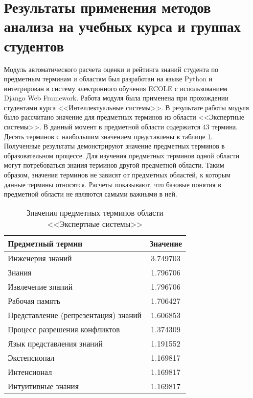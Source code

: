 \section{Результаты применения методов анализа на учебных курса и группах студентов} \label{sect4_5}

Модуль автоматического расчета оценки и рейтинга знаний студента по предметным терминам и областям был разработан на языке Python и интегрирован в систему электронного обучения ECOLE с использованием Django Web Framework. Работа модуля была применена при прохождении студентами курса <<Интеллектуальные системы>>. В результате работы модуля было рассчитано значение для предметных терминов из области <<Экспертные системы>>. В данный момент в предметной области содержится 43 термина. Десять терминов с наибольшим значением представлены в таблице \ref{table:term_importance_result}. Полученные результаты демонстрируют значение предметных терминов в образовательном процессе. Для изучения предметных терминов одной области могут потребоваться знания терминов другой предметной области. Таким образом, значения терминов не зависят от предметных областей, к которым данные термины относятся. Расчеты показывают, что базовые понятия в предметной области не являются самыми важными в ней.    

\begin{table}
\centering
\caption{Значения предметных терминов области <<Экспертные системы>>}
\label{table:term_importance_result}
\begin{tabular}{|p{7cm}|c|}
\hline Предметный термин & Значение \\
\hline Инженерия знаний & 3.749703 \\
\hline Знания & 1.796706 \\
\hline Извлечение знаний & 1.796706 \\
\hline Рабочая память & 1.706427 \\
\hline Представление (репрезентация) знаний & 1.606853 \\
\hline Процесс разрешения конфликтов & 1.374309 \\
\hline Язык представления знаний & 1.191552 \\
\hline Экстенсионал & 1.169817 \\
\hline Интенсионал & 1.169817 \\
\hline Интуитивные знания & 1.169817 \\
\hline
\end{tabular}
\end{table}

